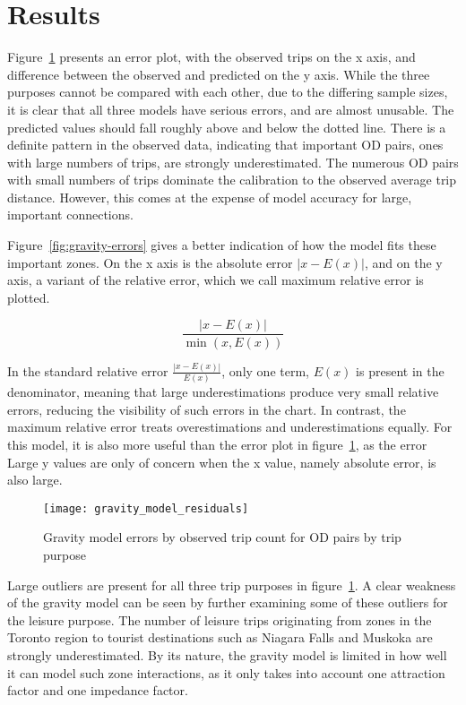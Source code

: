 \section{Results}
Figure~\ref{fig:gravity-residuals} presents an error plot, with the observed trips on the x axis, and difference between the observed and predicted on the y axis. While the three purposes cannot be compared with each other, due to the differing sample sizes, it is clear that all three models have serious errors, and are almost unusable. The predicted values should fall roughly above and below the dotted line. There is a definite pattern in the observed data, indicating that important OD pairs, ones with large numbers of trips, are strongly underestimated. The numerous OD pairs with small numbers of trips dominate the calibration to the observed average trip distance. However, this comes at the expense of model accuracy for large, important connections.

Figure~\ref{fig:gravity-errors} gives a better indication of how the model fits these important zones. On the x axis is the absolute error $|x - E(x)|$, and on the y axis, a variant of the relative error, which we call maximum relative error is plotted. 

$$\frac{|x-E(x)|}{\min(x, E(x))}$$

In the standard relative error $\frac{|x-E(x)|}{E(x)}$, only one term, $E(x)$ is present in the denominator, meaning that large underestimations produce very small relative errors, reducing the visibility of such errors in the chart. In contrast, the maximum relative error treats overestimations and underestimations equally. For this model, it is also more useful than the error plot in figure~\ref{fig:gravity-residuals}, as the error Large y values are only of concern when the x value, namely absolute error, is also large.

\begin{figure}[H]
\centering
\texttt{[image: gravity\_model\_residuals]}
\caption{Gravity model errors by observed trip count for OD pairs by trip purpose}
\label{fig:gravity-residuals}
\end{figure}

Large outliers are present for all three trip purposes in figure~\ref{fig:gravity-residuals}. A clear weakness of the gravity model can be seen by further examining some of these outliers for the leisure purpose. The number of leisure trips originating from zones in the Toronto region to tourist destinations such as Niagara Falls and Muskoka are strongly underestimated. By its nature, the gravity model is limited in how well it can model such zone interactions, as it only takes into account one attraction factor and one impedance factor.


